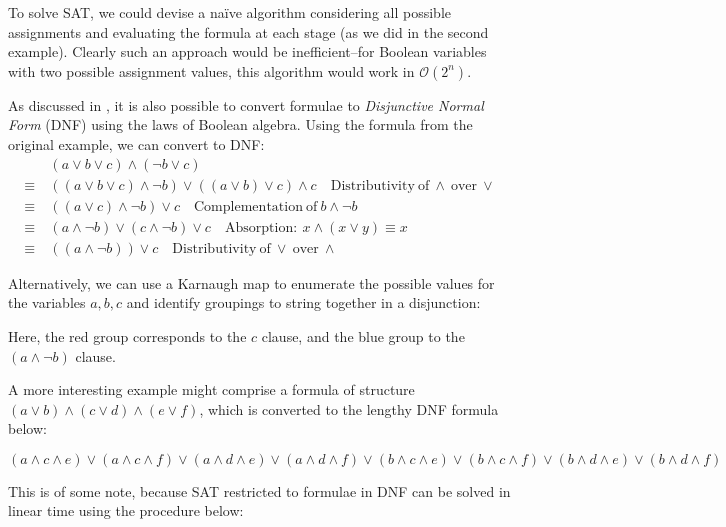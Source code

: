 \documentclass[a4paper,openany,12pt]{book}
\begin{document}
To solve SAT, we could devise a naïve algorithm considering all possible assignments and evaluating the formula at each
stage (as we did in the second example).
Clearly such an approach would be inefficient--for Boolean variables with two possible assignment values, this algorithm
would work in $\mathcal{O}(2^n)$.

As discussed in \citet{miltersen2005converting}, it is also possible to convert formulae to \emph{Disjunctive Normal
Form} (DNF) using the laws of Boolean algebra.
Using the formula from the original example, we can convert to DNF:
\begin{align*} & (a \lor b \lor c) \land (\neg b \lor c) \\
   \equiv~ & ((a \lor b \lor c) \land \neg b) \lor ((a \lor b) \lor c) \land c\quad \mathrm{Distributivity~of}~\land~\mathrm{over}~\lor \\
   \equiv~  & ((a \lor c) \land \neg b) \lor c\quad  \mathrm{Complementation~of}~b \land \neg b \\
   \equiv~  & (a \land \neg b) \lor (c \land \neg b) \lor c\quad \mathrm{Absorption:}~x \land (x \lor y) \equiv x \\
   \equiv~  & ((a \land \neg b)) \lor c\quad  \mathrm{Distributivity~of}~\lor~\mathrm{over}~\land
\end{align*}

Alternatively, we can use a Karnaugh map to enumerate the possible values for the variables $a, b, c$ and identify
groupings to string together in a disjunction:

\begin{Karnaughvuit}
\end{Karnaughvuit}

Here, the red group corresponds to the $c$ clause, and the blue group to the $(a \land \neg b)$ clause.

    A more interesting example might comprise a formula of structure  \(
    (a \lor b) \land (c \lor d) \land (e \lor f)
    \), which is converted to the lengthy DNF formula below:
    
    \[
    (a \land c \land e) \lor (a \land c \land f) \lor (a \land d \land e) \lor (a \land d \land 
    f) \lor (b \land c \land e) \lor (b \land c \land f) \lor (b \land d \land e) \lor (b \land d \land
    f)
    \]
    \vspace{0.25em}

This is of some note, because SAT restricted to formulae in DNF can be solved in linear time using the procedure below:
\end{document}
